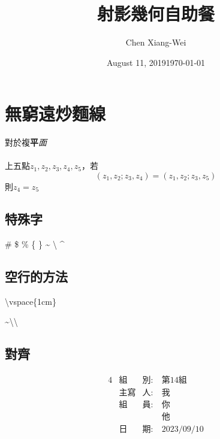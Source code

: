 
\raggedright
\setlength{\parindent}{2em} %
\newpage

\title{射影幾何自助餐} %
\author{Chen Xiang-Wei} %
\date{August 11, 2019}
\date{\today}%
\maketitle
\thispagestyle{fancy}
\raggedright
{}
\tableofcontents  %

\setcounter{section}{-1}

\section{無窮遠炒麵線}
\pro
{\color[RGB]{0,255,200}對於}{\color{blue}複}\textbf{平}\textit{面}
~\\%
~\\%
上五點$z_{1}, z_{2}, z_{3},z_{4},z_{5}$，若\\
\[(z_{1},z_{2};z_{3},z_{4})=(z_{1},z_{2};z_{3},z_5)\]
則$z_{4}=z_{5}$\\

\subsection[short]{特殊字}

\#
\$
\%
\{
\}
\~{}
\textbackslash
\^{}


\subsection{空行的方法}

\textbackslash vspace\{1cm\}
\vspace{1cm}

\~{}\textbackslash\textbackslash
~\\%

\subsection[short]{對齊}
\begin{alignat*}{4}
  &\text{組}&\text{別}:\ &\text{第14組}\\
  &\text{主寫}&\text{人}:\ &\text{我 }\\
  &\text{組}&\text{員}:\ &\text{你 }\\
       &&&\text{他 }\\
  &\text{日}&\text{期}:\ &\text{2023/09/10}\\
\end{alignat*}   


